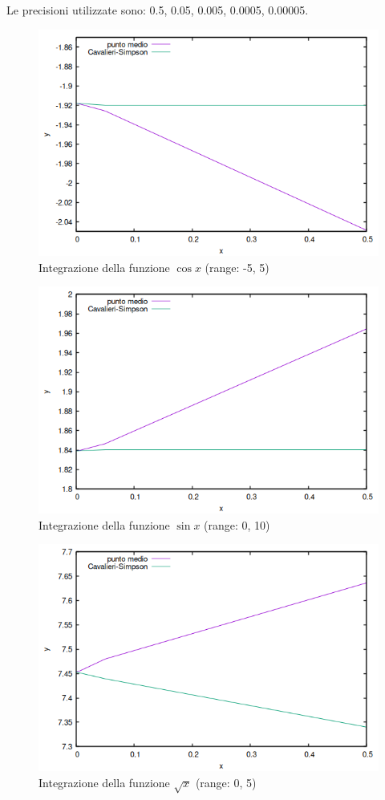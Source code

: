 \documentclass{article}
\begin{document}
Le precisioni utilizzate sono: 0.5, 0.05, 0.005, 0.0005, 0.00005.
\begin{figure}[ht]
   \centering
   \includegraphics*[scale=.5]{../grafici/immagini/coseno_integrazione.png}
   \caption{Integrazione della funzione $\cos x$ (range: -5, 5)}
\end{figure}
\begin{figure}[ht]
   \centering
   \includegraphics*[scale=.5]{../grafici/immagini/seno_integrazione.png}
   \caption{Integrazione della funzione $\sin x$ (range: 0, 10)}
\end{figure}
\begin{figure}[ht]
   \centering
   \includegraphics*[scale=.5]{../grafici/immagini/sqrt_integrazione.png}
   \caption{Integrazione della funzione $\sqrt{x}$ (range: 0, 5)}
\end{figure}
\end{document}
